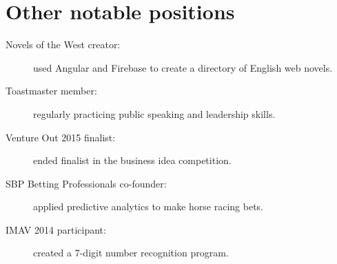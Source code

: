 \documentclass[10pt]{CurriculumVitae}
\begin{document}
  \section{Other notable positions}
    \begin{description}
      \item[Novels of the West creator:] used Angular and Firebase to create a directory of English web novels.
      \item[Toastmaster member:] regularly practicing public speaking and leadership skills.
      \item[Venture Out 2015 finalist:] ended finalist in the business idea competition.
      \item[SBP Betting Professionals co-founder:] applied predictive analytics to make horse racing bets.
      \item[IMAV 2014 participant:] created a 7-digit number recognition program.
    \end{description}
\end{document}
